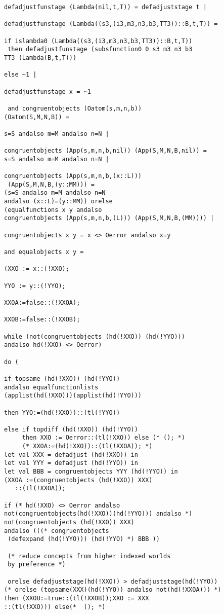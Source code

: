 \documentclass[12pt]{article}
\begin{document}
\begin{verbatim}
defadjustfunstage (Lambda(nil,t,T)) = defadjuststage t |

defadjustfunstage (Lambda((s3,(i3,m3,n3,b3,TT3))::B,t,T)) =

if islambda0 (Lambda((s3,(i3,m3,n3,b3,TT3))::B,t,T))
 then defadjustfunstage (subsfunction0 0 s3 m3 n3 b3 
TT3 (Lambda(B,t,T)))

else ~1 |

defadjustfunstage x = ~1

 and congruentobjects (Oatom(s,m,n,b)) 
(Oatom(S,M,N,B)) =

s=S andalso m=M andalso n=N |

congruentobjects (App(s,m,n,b,nil)) (App(S,M,N,B,nil)) =
s=S andalso m=M andalso n=N |

congruentobjects (App(s,m,n,b,(x::L)))
 (App(S,M,N,B,(y::MM))) =
(s=S andalso m=M andalso n=N 
andalso (x::L)=(y::MM)) orelse
(equalfunctions x y andalso 
congruentobjects (App(s,m,n,b,(L))) (App(S,M,N,B,(MM)))) |

congruentobjects x y = x <> Oerror andalso x=y

and equalobjects x y =

(XXO := x::(!XXO);

YYO := y::(!YYO);

XXOA:=false::(!XXOA);

XXOB:=false::(!XXOB);

while (not(congruentobjects (hd(!XXO)) (hd(!YYO))) 
andalso hd(!XXO) <> Oerror)

do (

if topsame (hd(!XXO)) (hd(!YYO)) 
andalso equalfunctionlists 
(applist(hd(!XXO)))(applist(hd(!YYO)))

then YYO:=(hd(!XXO))::(tl(!YYO))

else if topdiff (hd(!XXO)) (hd(!YYO)) 
     then XXO := Oerror::(tl(!XXO)) else (* (); *)
	 (* XXOA:=(hd(!XXO))::(tl(!XXOA)); *)
let val XXX = defadjust (hd(!XXO)) in
let val YYY = defadjust (hd(!YYO)) in
let val BBB = congruentobjects YYY (hd(!YYO)) in
(XXOA :=(congruentobjects (hd(!XXO)) XXX)
   ::(tl(!XXOA));

if (* hd(!XXO) <> Oerror andalso 
not(congruentobjects(hd(!XXO))(hd(!YYO))) andalso *)
not(congruentobjects (hd(!XXO)) XXX) 
andalso (((* congruentobjects
 (defexpand (hd(!YYO))) (hd(!YYO) *) BBB ))
 
 (* reduce concepts from higher indexed worlds
 by preference *)
 
 orelse defadjuststage(hd(!XXO)) > defadjuststage(hd(!YYO))
(* orelse (topsame(XXX)(hd(!YYO)) andalso not(hd(!XXOA))) *)
then (XXOB:=true::(tl(!XXOB));XXO := XXX
::(tl(!XXO))) else(*  (); *)


\end{verbatim}
\end{document}
